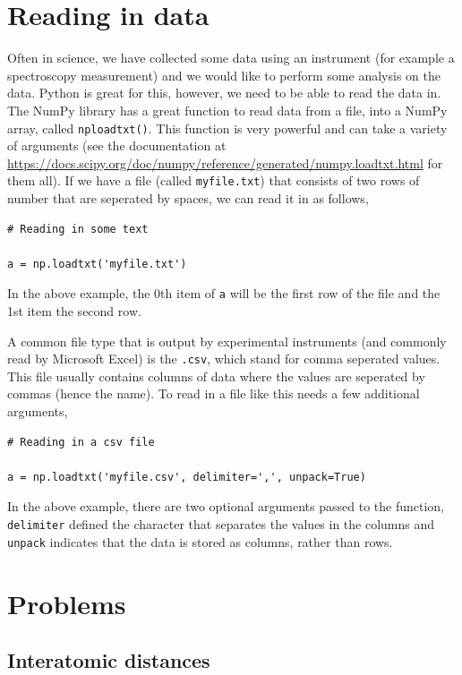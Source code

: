 \documentclass[a4paper]{article}
\begin{document}
\section{Reading in data}

Often in science, we have collected some data using an instrument (for example a spectroscopy measurement) and we would like to perform some analysis on the data.
Python is great for this, however, we need to be able to read the data in.
The NumPy library has a great function to read data from a file, into a NumPy array, called \texttt{nploadtxt()}.
This function is very powerful and can take a variety of arguments (see the documentation at \url{https://docs.scipy.org/doc/numpy/reference/generated/numpy.loadtxt.html} for them all).
If we have a file (called \texttt{myfile.txt}) that consists of two rows of number that are seperated by spaces, we can read it in as follows,
\begin{lstlisting}
# Reading in some text

a = np.loadtxt('myfile.txt')
\end{lstlisting}
In the above example, the 0th item of \texttt{a} will be the first row of the file and the 1st item the second row.

A common file type that is output by experimental instruments (and commonly read by Microsoft Excel) is the \texttt{.csv}, which stand for comma seperated values.
This file usually contains columns of data where the values are seperated by commas (hence the name).
To read in a file like this needs a few additional arguments,
\begin{lstlisting}
# Reading in a csv file

a = np.loadtxt('myfile.csv', delimiter=',', unpack=True)
\end{lstlisting}
In the above example, there are two optional arguments passed to the function, \texttt{delimiter} defined the character that separates the values in the columns and \texttt{unpack} indicates that the data is stored as columns, rather than rows. 

\section{Problems}

\subsection{Interatomic distances}
\end{document}

